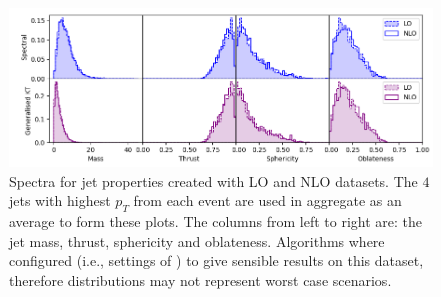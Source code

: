 \begin{figure}[htp]
    \includegraphics[width=\textwidth]{graphics/IRC_singles3}
    \caption{Spectra for jet properties created with LO and NLO datasets.
             The \(4\) jets with highest \(p_T\) from each event are used in aggregate as an average to 
             form these plots.
             The columns from left to right are: the jet mass, 
             thrust, sphericity and oblateness.
             Algorithms where configured (i.e., settings of \stoppingdeltar{})
             to give sensible results on
             this dataset, therefore distributions may not represent worst case scenarios.
         }\label{fig:IRC_singles2}

\end{figure}
